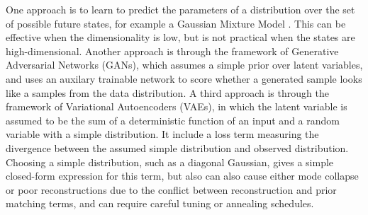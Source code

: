 \documentclass{article}
\begin{document}
One approach is to learn to predict the parameters of a distribution over the set of possible future states, for example a Gaussian Mixture Model \citep{mixture-density-networks}.
This can be effective when the dimensionality is low, but is not practical when the states are high-dimensional.
Another approach is through the framework of Generative Adversarial Networks (GANs), which assumes a simple prior over latent variables, and uses an auxilary trainable network to score whether a generated sample looks like a samples from the data distribution.
A third approach is through the framework of Variational Autoencoders (VAEs), in which the latent variable is assumed to be the sum of a deterministic function of an input and a random variable with a simple distribution. It include a loss term measuring the divergence between the assumed simple distribution and observed distribution.
Choosing a simple distribution, such as a diagonal Gaussian, gives a simple closed-form expression for this term, but also can also cause either mode collapse or poor reconstructions due to the conflict between reconstruction and prior matching terms, and can require careful tuning or annealing schedules.
\end{document}

